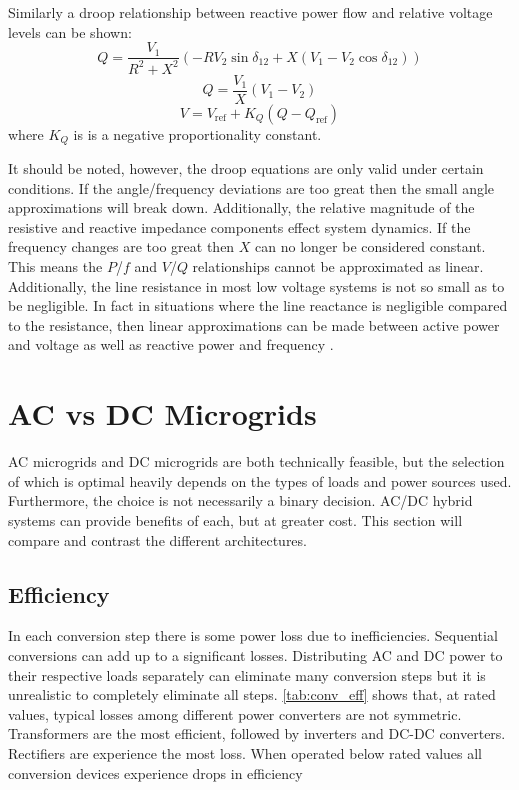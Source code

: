 Similarly a droop relationship between reactive power flow and relative voltage levels can be shown:
\begin{equation}
Q = \frac{V_1}{R^2 + X^2} \left( -R V_2 \sin{\delta_{12}} + X \left(V_1 - V_2 \cos{\delta_{12}}\right) \right)
\end{equation}
\begin{equation}
Q = \frac{V_1}{X} \left( V_1 - V_2 \right)
\end{equation}
\begin{equation}
V = V_{\text{ref}} + K_Q \left( Q - Q_{\text{ref}} \right)
\end{equation}
where $K_Q$ is is a negative proportionality constant. 

It should be noted, however, the droop equations are only valid under certain conditions. If the angle/frequency deviations are too great then the small angle approximations will break down. Additionally, the relative magnitude of the resistive and reactive impedance components effect system dynamics. If the frequency changes are too great then $X$ can no longer be considered constant. This means the $P$/$f$ and $V$/$Q$ relationships cannot be approximated as linear. Additionally, the line resistance in most low voltage systems is not so small as to be negligible. In fact in situations where the line reactance is negligible compared to the resistance, then linear approximations can be made between active power and voltage as well as reactive power and frequency \cite{YunWeiLi2009}.



\section{AC vs DC Microgrids}
AC microgrids and DC microgrids are both technically feasible, but the selection of which is optimal heavily depends on the types of loads and power sources used. Furthermore, the choice is not necessarily a binary decision. AC/DC hybrid systems can provide benefits of each, but at greater cost. This section will compare and contrast the different architectures.

\subsection{Efficiency}
In each conversion step there is some power loss due to inefficiencies. Sequential conversions can add up to a significant losses. Distributing AC and DC power to their respective loads separately can eliminate many conversion steps but it is unrealistic to completely eliminate all steps. \autoref{tab:conv_eff} shows that, at rated values, typical losses among different power converters are not symmetric. Transformers are the most efficient, followed by inverters and DC-DC converters. Rectifiers are experience the most loss. When operated below rated values all conversion devices experience drops in efficiency

